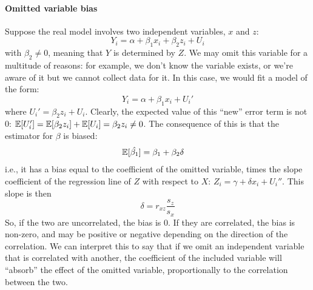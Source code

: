 \paragraph{Omitted variable bias}
Suppose the real model involves two independent variables, $x$ and $z$:
\begin{equation*}
    Y_i = \alpha + \beta_1 x_i + \beta_2 z_i + U_i
\end{equation*}
with $\beta_2 \not = 0$, meaning that $Y$ is determined by $Z$. We may omit this variable for a multitude of reasons: for example, we don't know the variable exists, or we're aware of it but we cannot collect data for it. In this case, we would fit a model of the form:
\begin{equation*}
    Y_i = \alpha + \beta_1 x_i + U_i'
\end{equation*}
where $U_i' = \beta_2 z_i + U_i$. Clearly, the expected value of this ``new'' error term is not 0: $\mathbb{E}[U_i'] = \mathbb{E}[\beta_2 z_i] + \mathbb{E}[U_i] = \beta_2 z_i \not = 0$. The consequence of this is that the estimator for $\beta$ is biased:
\begin{align*}
    &\mathbb{E}[\hat{\beta_1}] = \beta_1 + \beta_2 \delta
\end{align*}
i.e., it has a bias equal to the coefficient of the omitted variable, times the slope coefficient of the regression line of $Z$ with respect to $X$: $Z_i = \gamma + \delta x_i + U_i''$. This slope is then
\begin{equation*}
    \delta = r_{xz} \frac{s_z}{s_x}
\end{equation*}
So, if the two are uncorrelated, the bias is 0. If they are correlated, the bias is non-zero, and may be positive or negative depending on the direction of the correlation. We can interpret this to say that if we omit an independent variable that is correlated with another, the coefficient of the included variable will ``absorb'' the effect of the omitted variable, proportionally to the correlation between the two.

